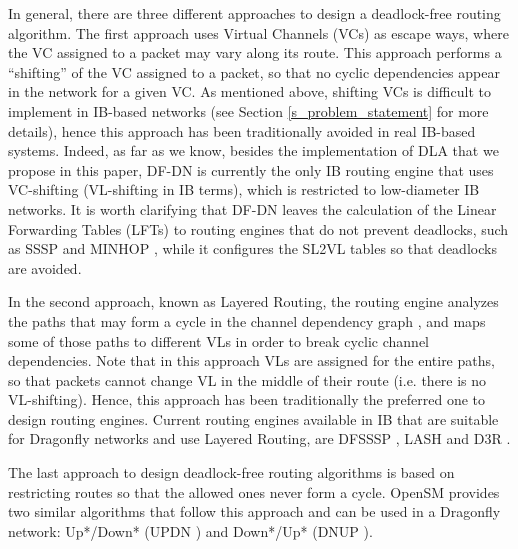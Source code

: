 \documentclass[review]{elsarticle}
\newcommand{\dfly}{Dragonfly}
\newcommand{\ib}{IB}
\begin{document}
In general, there are three different approaches to design a deadlock-free routing algorithm.
The first approach uses Virtual Channels (VCs) \cite{dally87_vc} as escape ways, where the VC assigned to a packet
may vary along its route.
This approach performs a ``shifting'' of the VC assigned to a packet, so that no cyclic dependencies appear in the network for a given VC.
As mentioned above, shifting VCs is difficult to implement in \ib-based networks (see Section \ref{s_problem_statement} for more details),
hence this approach has been traditionally avoided in real \ib-based systems.
Indeed, as far as we know, besides the implementation of DLA that we propose in this paper, DF-DN \cite{schneider2016_dfdn} is currently the only \ib{} routing engine that uses VC-shifting
(VL-shifting in \ib{} terms), which is restricted to low-diameter \ib{} networks.
It is worth clarifying that DF-DN leaves the calculation of the Linear Forwarding Tables (LFTs) to routing engines that do not
prevent deadlocks, such as SSSP \cite{sssp_hoefler_2009} and MINHOP \cite{opensm}, while it configures the SL2VL tables so that deadlocks are avoided.

In the second approach, known as Layered Routing, the routing engine analyzes the paths that may form a cycle in the channel dependency graph \citep{dally_principles_2003},
and maps some of those paths to different VLs in order to break cyclic channel dependencies.
Note that in this approach VLs are assigned for the entire paths, so that packets cannot change VL in the middle of their route (i.e. there is no VL-shifting).
Hence, this approach has been traditionally the preferred one to design routing engines.
Current routing engines available in \ib{} that are suitable for \dfly{} networks and use Layered Routing, are DFSSSP \cite{domke2011_dfsssp},
LASH \cite{skeie2002_lash} and D3R \cite{maglione2018_d3r}.

The last approach to design deadlock-free routing algorithms is based on restricting routes so that the allowed ones never form a cycle.
OpenSM provides two similar algorithms that follow this approach and can be used in a \dfly{} network:
Up*/Down* \cite{up_down_1991} (UPDN \cite{sancho2001_updn}) and  Down*/Up* \cite{up_down_1991} (DNUP \cite{sancho2001_updn}).
\end{document}
